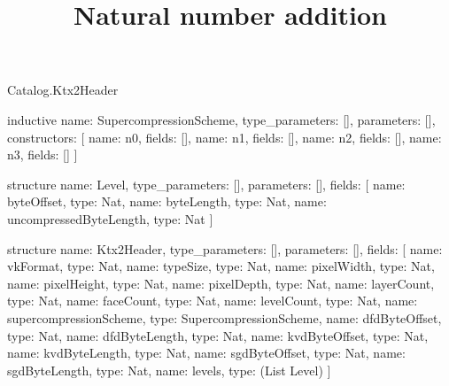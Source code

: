 \begin{lexlean}{Catalog.Ktx2Header}
\title{Natural number addition}
\begin{semanticmodule}
inductive{
  name: SupercompressionScheme,
  type_parameters: [],
  parameters: [],
  constructors: [
    {name: n0, fields: []},
    {name: n1, fields: []},
    {name: n2, fields: []},
    {name: n3, fields: []}
  ]
}

structure{
  name: Level,
  type_parameters: [],
  parameters: [],
  fields: [
    {name: byteOffset, type: Nat},
    {name: byteLength, type: Nat},
    {name: uncompressedByteLength, type: Nat}
  ]
}

structure{
  name: Ktx2Header,
  type_parameters: [],
  parameters: [],
  fields: [
    {name: vkFormat, type: Nat},
    {name: typeSize, type: Nat},
    {name: pixelWidth, type: Nat},
    {name: pixelHeight, type: Nat},
    {name: pixelDepth, type: Nat},
    {name: layerCount, type: Nat},
    {name: faceCount, type: Nat},
    {name: levelCount, type: Nat},
    {name: supercompressionScheme, type: SupercompressionScheme},
    {name: dfdByteOffset, type: Nat},
    {name: dfdByteLength, type: Nat},
    {name: kvdByteOffset, type: Nat},
    {name: kvdByteLength, type: Nat},
    {name: sgdByteOffset, type: Nat},
    {name: sgdByteLength, type: Nat},
    {name: levels, type: (List Level)}
  ]
}
\end{semanticmodule}
\end{lexlean}
